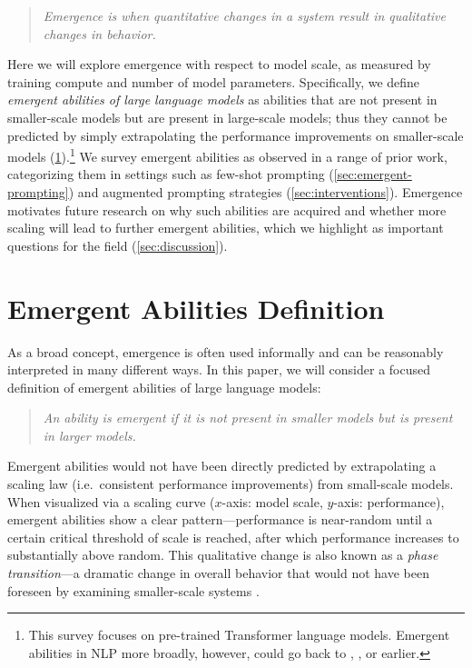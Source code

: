 \begin{quote}
\textit{Emergence is when quantitative changes in a system result in qualitative changes in behavior.}
\end{quote}

Here we will explore emergence with respect to model scale, as measured by training compute and number of model parameters. Specifically, we define \textit{emergent abilities of large language models} as abilities that are not present in smaller-scale models but are present in large-scale models; thus they cannot be predicted by simply extrapolating the performance improvements on smaller-scale models (\ref{sec:definition}).\footnote{This survey focuses on pre-trained Transformer language models. Emergent abilities in NLP more broadly, however, could go back to \citet{miller-etal-2004-name},  \citet{liang2005semi}, or earlier.} We survey emergent abilities as observed in a range of prior work, categorizing them in settings such as few-shot prompting (\ref{sec:emergent-prompting}) and augmented prompting strategies (\ref{sec:interventions}).
Emergence motivates future research on why such abilities are acquired and whether more scaling will lead to further emergent abilities, which we highlight as important questions for the field (\ref{sec:discussion}).

\section{Emergent Abilities Definition}\label{sec:definition}
As a broad concept, emergence is often used informally and can be reasonably interpreted in many different ways. In this paper, we will consider a focused definition of emergent abilities of large language models:

\begin{quote}
    \emph{An ability is emergent if it is not present in smaller models but is present in larger models. }
\end{quote}

Emergent abilities would not have been directly predicted by extrapolating a scaling law (i.e.\ consistent performance improvements) from small-scale models. When visualized via a scaling curve ($x$-axis: model scale, $y$-axis: performance), emergent abilities show a clear pattern---performance is near-random until a certain critical threshold of scale is reached, after which performance increases to substantially above random. This qualitative change is also known as a \textit{phase transition}---a dramatic change in overall behavior that would not have been foreseen by examining smaller-scale systems \citep{huberman1987phase}.


